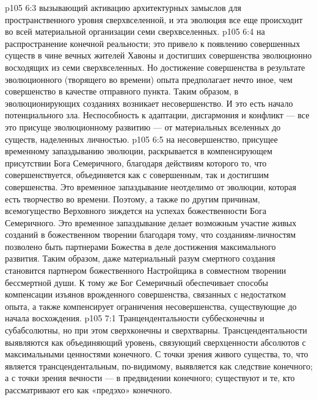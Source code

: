 \vs p105 6:3 \bibnobreakspace {} вызывающий активацию архитектурных замыслов для пространственного уровня сверхвселенной, и эта эволюция все еще происходит во всей материальной организации семи сверхвселенных.
\vs p105 6:4 \bibnobreakspace {} на распространение конечной реальности; это привело к появлению совершенных существ в чине вечных жителей Хавоны и достигших совершенства эволюционно восходящих из семи сверхвселенных. Но достижение совершенства в результате эволюционного (творящего во времени) опыта предполагает нечто иное, чем совершенство в качестве отправного пункта. Таким образом, в эволюционирующих созданиях возникает несовершенство. И это есть начало потенциального зла. Неспособность к адаптации, дисгармония и конфликт --- все это присуще эволюционному развитию --- от материальных вселенных до существ, наделенных личностью.
\vs p105 6:5 \bibnobreakspace {} на несовершенство, присущее временному запаздыванию эволюции, раскрывается в компенсирующем присутствии Бога Семеричного, благодаря действиям которого то, что совершенствуется, объединяется как с совершенным, так и достигшим совершенства. Это временное запаздывание неотделимо от эволюции, которая есть творчество во времени. Поэтому, а также по другим причинам, всемогущество Верховного зиждется на успехах божественности Бога Семеричного. Это временное запаздывание делает возможным участие живых созданий в божественном творении благодаря тому, что созданиям\hyp{}личностям позволено быть партнерами Божества в деле достижения максимального развития. Таким образом, даже материальный разум смертного создания становится партнером божественного Настройщика в совместном творении бессмертной души. К тому же Бог Семеричный обеспечивает способы компенсации изъянов врожденного совершенства, связанных с недостатком опыта, а также компенсирует ограничения несовершенства, существующие до начала восхождения.
\vs p105 7:1 Транцендентальности суббесконечны и субабсолютны, но при этом сверхконечны и сверхтварны. Трансцендентальности выявляются как объединяющий уровень, связующий сверхценности абсолютов с максимальными ценностями конечного. С точки зрения живого существа, то, что является трансцендентальным, по\hyp{}видимому, выявляется как следствие конечного; а с точки зрения вечности --- в предвидении конечного; существуют и те, кто рассматривают его как «предэхо» конечного.
